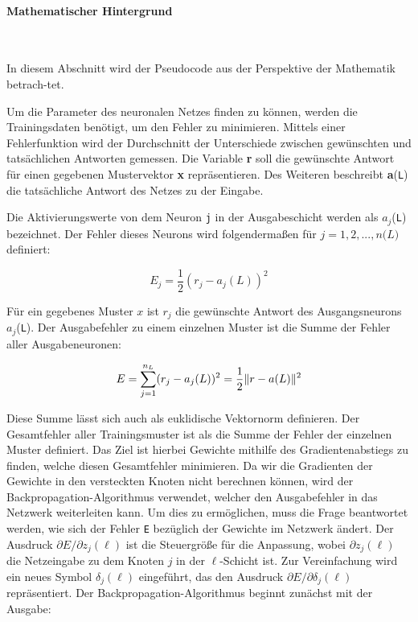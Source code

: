 

\paragraph{Mathematischer Hintergrund}
~\newline

In diesem Abschnitt wird der Pseudocode aus der Perspektive der Mathematik betrach-\newline tet\cite{Gonzalez2018}.
\newline

Um die Parameter des neuronalen Netzes finden zu können, werden die Trainingsdaten benötigt, um den Fehler zu minimieren. Mittels einer Fehlerfunktion wird der Durchschnitt der Unterschiede zwischen gewünschten und tatsächlichen Antworten gemessen. Die Variable \textbf{r} soll die gewünschte Antwort für einen gegebenen Mustervektor \textbf{x} repräsentieren. Des Weiteren beschreibt \textbf{a}(\texttt{L}) die tatsächliche Antwort des Netzes zu der Eingabe. 


Die Aktivierungswerte von dem Neuron \texttt{j} in der Ausgabeschicht werden als $a_j$(\texttt{L}) bezeichnet. Der Fehler dieses Neurons wird folgendermaßen für $j = 1,2,...,n\texttt(L)$ definiert:

\begin{equation}
\label{fehler_E}
	E_j = \frac{1}{2}(r_j - a_j(L))^2
\end{equation}

Für ein gegebenes Muster $x$ ist $r_j$ die gewünschte Antwort des Ausgangsneurons $a_j$(\texttt{L}). Der Ausgabefehler zu einem einzelnen Muster ist die Summe der Fehler aller Ausgabeneuronen:

\begin{equation}
E = \sum_{j = 1}^{n_L}(r_j -a_j(L))^2 \\\\
 = \frac{1}{2}\Vert{r - a(L)}\Vert^2
\end{equation}

Diese Summe lässt sich auch als euklidische Vektornorm definieren. Der Gesamtfehler aller Trainingsmuster ist als die Summe der Fehler der einzelnen Muster definiert. Das Ziel ist hierbei Gewichte mithilfe des Gradientenabstiegs zu finden, welche diesen Gesamtfehler minimieren. Da wir die Gradienten der Gewichte in den versteckten Knoten nicht berechnen können, wird der Backpropagation-Algorithmus verwendet, welcher den Ausgabefehler in das Netzwerk weiterleiten kann. Um dies zu ermöglichen, muss die Frage beantwortet werden, wie sich der Fehler \texttt{E} bezüglich der Gewichte im Netzwerk ändert. Der Ausdruck $\partial E/\partial z_j(\ell)$ ist die Steuergröße für die Anpassung, wobei $\partial z_j(\ell)$ die Netzeingabe zu dem Knoten $j$ in der $\ell$-Schicht ist. Zur Vereinfachung wird ein neues Symbol $\delta_j(\ell)$ eingeführt, das den Ausdruck $\partial E/\partial \delta_j(\ell)$ repräsentiert. Der Backpropagation-Algorithmus beginnt zunächst mit der Ausgabe: 

